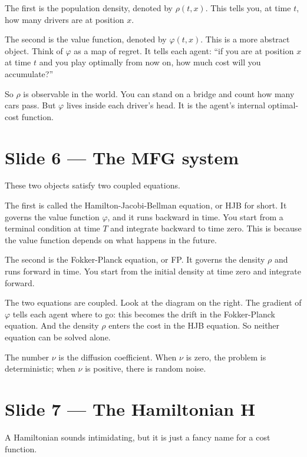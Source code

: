 \documentclass[11pt]{article}
\begin{document}
The first is the population density, denoted by $\rho(t, x)$. This tells you,
at time $t$, how many drivers are at position $x$.

The second is the value function, denoted by $\varphi(t, x)$. This is a more
abstract object. Think of $\varphi$ as a map of regret. It tells each agent:
``if you are at position $x$ at time $t$ and you play optimally from now
on, how much cost will you accumulate?''

So $\rho$ is observable in the world. You can stand on a bridge and count
how many cars pass.  But $\varphi$ lives inside each driver's head. It is the
agent's internal optimal-cost function.

\section*{Slide 6 --- The MFG system}

These two objects satisfy two coupled equations.

The first is called the Hamilton-Jacobi-Bellman equation, or HJB for short.
It governs the value function $\varphi$, and it runs backward in time. You
start from a terminal condition at time $T$ and integrate backward to time
zero. This is because the value function depends on what happens in the
future.

The second is the Fokker-Planck equation, or FP. It governs the density $\rho$
and runs forward in time. You start from the initial density at time zero
and integrate forward.

The two equations are coupled. Look at the diagram on the right. The gradient
of $\varphi$ tells each agent where to go: this becomes the drift in the
Fokker-Planck equation. And the density $\rho$ enters the cost in the HJB
equation. So neither equation can be solved alone.

The number $\nu$ is the diffusion coefficient. When $\nu$ is zero, the
problem is deterministic; when $\nu$ is positive, there is random noise.

\section*{Slide 7 --- The Hamiltonian H}

A Hamiltonian sounds intimidating, but it is just a fancy name for a cost
function.
\end{document}
